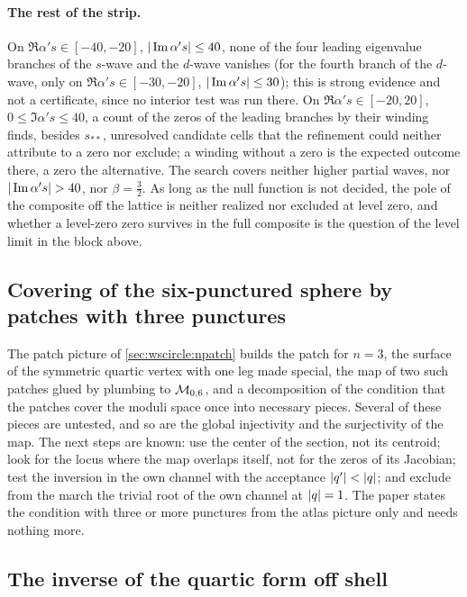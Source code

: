 \paragraph{The rest of the strip.}
On $\Re \alpha' s \in [-40, -20]$, ${|\operatorname{Im} \alpha' s|} \le 40$, none of the four leading eigenvalue branches of the $s$-wave and the $d$-wave vanishes (for the fourth branch of the $d$-wave, only on $\Re \alpha' s \in [-30, -20]$, ${|\operatorname{Im} \alpha' s|} \le 30$); this is strong evidence and not a certificate, since no interior test was run there.
On $\Re \alpha' s \in [-20, 20]$, $0 \le \Im \alpha' s \le 40$, a count of the zeros of the leading branches by their winding finds, besides $s_{**}$, unresolved candidate cells that the refinement could neither attribute to a zero nor exclude; a winding without a zero is the expected outcome there, a zero the alternative.
The search covers neither higher partial waves, nor ${|\operatorname{Im} \alpha' s|} > 40$, nor $\beta = \tfrac{3}{2}$.
As long as the null function is not decided, the pole of the composite off the lattice is neither realized nor excluded at level zero, and whether a level-zero zero survives in the full composite is the question of the level limit in the block above.

\subsection{Covering of the six-punctured sphere by patches with three punctures}
\label{sec:open:npatch}

The patch picture of \cref{sec:wscircle:npatch} builds the patch for $n = 3$, the surface of the symmetric quartic vertex with one leg made special, the map of two such patches glued by plumbing to ${\mathcal{M}}_{0, 6}$, and a decomposition of the condition that the patches cover the moduli space once into necessary pieces.
Several of these pieces are untested, and so are the global injectivity and the surjectivity of the map.
The next steps are known: use the center of the section, not its centroid; look for the locus where the map overlaps itself, not for the zeros of its Jacobian; test the inversion in the own channel with the acceptance ${|q'|} < {|q|}$; and exclude from the march the trivial root of the own channel at ${|q|} = 1$.
The paper states the condition with three or more punctures from the atlas picture only and needs nothing more.

\subsection{The inverse of the quartic form off shell}
\label{sec:open:inverse-offshell}

